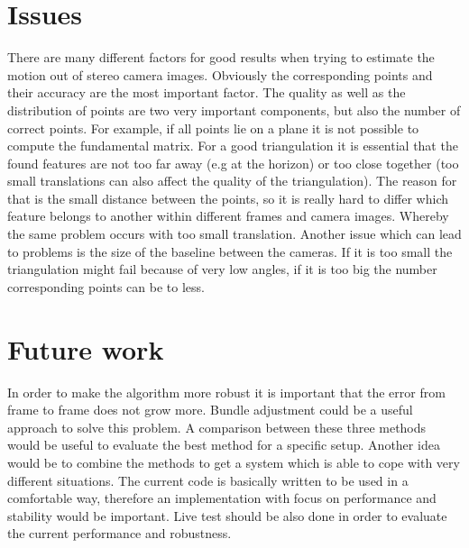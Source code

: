 \documentclass[11pt]{article}
\begin{document}
	\section{Issues}

	There are many different factors for good results when trying to estimate the motion out of stereo camera images. Obviously the corresponding points and their accuracy are the most important factor. The quality as well as the distribution of points are two very important components, but also the number of correct points. For example, if all points lie on a plane it is not possible to compute the fundamental matrix. For a good triangulation it is essential that the found features are not too far away (e.g at the horizon) or too close together (too small translations can also affect the quality of the triangulation). The reason for that is the small distance between the points, so it is really hard to differ which feature belongs to another within different frames and camera images. Whereby the same problem occurs with too small translation. Another issue which can lead to problems is the size of the baseline between the cameras. If it is too small the triangulation might fail because of very low angles, if it is too big the number corresponding points can be to less.
	
	
	\section{Future work}
	In order to make the algorithm more robust it is important that the error from frame to frame does not grow more. Bundle adjustment could be a useful approach to solve this problem. A comparison between these three methods would be useful to evaluate the best method for a specific setup. Another idea would be to combine the methods to get a system which is able to cope with very different situations. The current code is basically written to be used in a comfortable way, therefore an implementation with focus on performance and stability would be important. Live test should be also done in order to evaluate the current performance and robustness.

	\newpage
	
\end{document}
